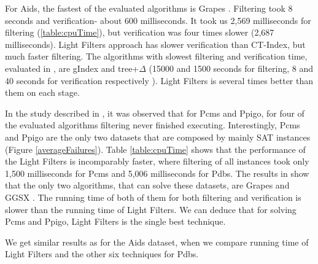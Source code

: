 \documentclass{l4proj}
\begin{document}
For Aids, the fastest of the evaluated algorithms is Grapes \cite{GRAPES}. Filtering took 8 seconds and verification- about 600 milliseconds. It took us 2,569 milliseconds for filtering (\ref{table:cpuTime}), but verification was four times slower (2,687 milliseconds). Light Filters approach has slower verification than CT-Index, but much faster filtering. The algorithms with slowest filtering and verification time, evaluated in \cite{foteini}, are gIndex and tree+$\Delta$ (15000 and 1500 seconds for filtering, 8 and 40 seconds for verification respectively \cite{foteini}). Light Filters is several times better than them on each stage. 

In the study described in \cite{foteini}, it was observed that for Pcms and Ppigo, for four of the evaluated algorithms filtering never finished executing. Interestingly, Pcms and Ppigo are the only two datasets that are composed by mainly SAT instances (Figure \ref{averageFailures}). Table \ref{table:cpuTime} shows that the performance of the Light Filters is incomparably faster, where filtering of all instances took only 1,500 milliseconds for Pcms and 5,006 milliseconds for Pdbs. The results in \cite{foteini} show that the only two algorithms, that can solve these datasets, are Grapes and GGSX \cite{graphgrepsx}. The running time of both of them for both filtering and verification is slower than the running time of Light Filters. We can deduce that for solving Pcms and Ppigo, Light Filters is the single best technique.

We get similar results as for the Aids dataset, when we compare running time of Light Filters and the other six techniques for Pdbs.
\end{document}
